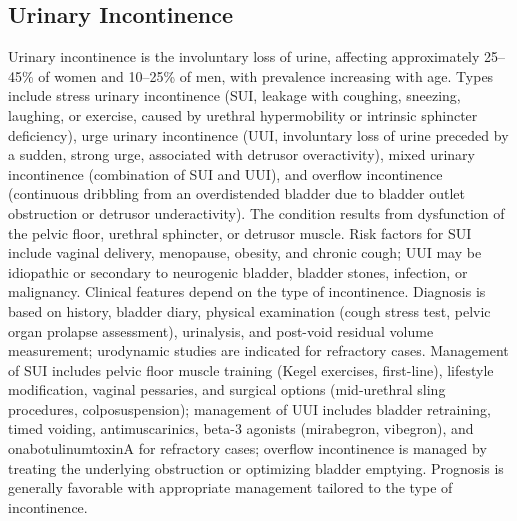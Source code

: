 



\label{sec:Lower Urinary Tract Disorders}

\subsection{Urinary Incontinence}
\label{sec:Urinary Incontinence}
Urinary incontinence is the involuntary loss of urine, affecting approximately 25--45\% of women and 10--25\% of men, with prevalence increasing with age. Types include stress urinary incontinence (SUI, leakage with coughing, sneezing, laughing, or exercise, caused by urethral hypermobility or intrinsic sphincter deficiency), urge urinary incontinence (UUI, involuntary loss of urine preceded by a sudden, strong urge, associated with detrusor overactivity), mixed urinary incontinence (combination of SUI and UUI), and overflow incontinence (continuous dribbling from an overdistended bladder due to bladder outlet obstruction or detrusor underactivity). The condition results from dysfunction of the pelvic floor, urethral sphincter, or detrusor muscle. Risk factors for SUI include vaginal delivery, menopause, obesity, and chronic cough; UUI may be idiopathic or secondary to neurogenic bladder, bladder stones, infection, or malignancy. Clinical features depend on the type of incontinence. Diagnosis is based on history, bladder diary, physical examination (cough stress test, pelvic organ prolapse assessment), urinalysis, and post-void residual volume measurement; urodynamic studies are indicated for refractory cases. Management of SUI includes pelvic floor muscle training (Kegel exercises, first-line), lifestyle modification, vaginal pessaries, and surgical options (mid-urethral sling procedures, colposuspension); management of UUI includes bladder retraining, timed voiding, antimuscarinics, beta-3 agonists (mirabegron, vibegron), and onabotulinumtoxinA for refractory cases; overflow incontinence is managed by treating the underlying obstruction or optimizing bladder emptying. Prognosis is generally favorable with appropriate management tailored to the type of incontinence.

